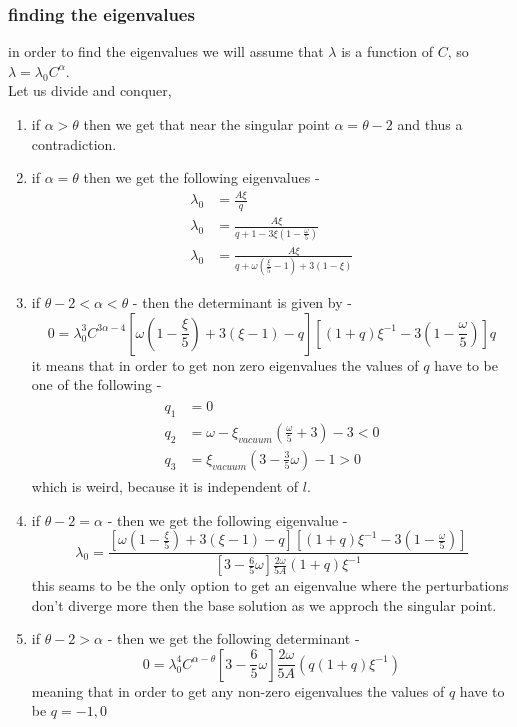 \documentclass{article}
\begin{document}
\subsubsection{finding the eigenvalues}
in order to find the eigenvalues we will assume that $\lambda$ is a function of $C$, so $\lambda = \lambda_0 C^{\alpha}$.\\ 
Let us divide and conquer,
\begin{enumerate}
    \item if $\alpha > \theta$ then we get that near the singular point $\alpha = \theta - 2$ and thus a contradiction.
    \item if $\alpha = \theta$ then we get the following eigenvalues -
    \begin{align}
        \lambda_0 &= \frac{A\xi}{q}\\
        \lambda_0 &=\frac{A\xi}{q + 1 - 3 \xi \left(1-\frac{\omega}{5}\right)}\\
        \lambda_0 &=\frac{A\xi}{q + \omega\left(\frac{\xi}{5} - 1\right)+3\left(1 - \xi\right)}
    \end{align}
    \item if $\theta - 2 < \alpha < \theta$ - then the determinant is given by -
    \begin{equation*}
        0=\lambda_0^{3}C^{3\alpha-4}\left[\omega\left(1-\frac{\xi}{5}\right)+3\left(\xi-1\right)-q\right]\left[\left(1+q\right)\xi^{-1}-3\left(1-\frac{\omega}{5}\right)\right]q
    \end{equation*}
    it means that in order to get non zero eigenvalues the values of $q$ have to be one of the following - 
    \begin{align}
        \begin{split}
            q_1&=0\\
            q_2&=\omega-\xi_{vacuum}\left(\frac{\omega}{5}+3\right)-3<0\\
            q_3&=\xi_{vacuum}\left(3-\frac{3}{5}\omega\right)-1>0
        \end{split}
    \end{align}
    which is weird, because it is independent of $l$.
    \item if $\theta - 2 = \alpha$ - then we get the following eigenvalue - 
    \begin{equation}
        \lambda_0=\frac{\left[\omega\left(1-\frac{\xi}{5}\right)+3\left(\xi-1\right)-q\right]\left[\left(1+q\right)\xi^{-1}-3\left(1-\frac{\omega}{5}\right)\right]}{\left[3-\frac{6}{5}\omega\right]\frac{2\omega}{5A}\left(1+q\right)\xi^{-1}}
    \end{equation}
    this seams to be the only option to get an eigenvalue where the perturbations don't diverge more then the base solution as we approch the singular point.
    \item if $\theta - 2 > \alpha$ - then we get the following determinant -
    \begin{equation*}
        0=\lambda_0^{4}C^{\alpha-\theta}\left[3-\frac{6}{5}\omega\right]\frac{2\omega}{5A}\left(q\left(1+q\right)\xi^{-1}\right)
    \end{equation*}
    meaning that in order to get any non-zero eigenvalues the values of $q$ have to be $q = -1,0$
\end{enumerate}
\end{document}
